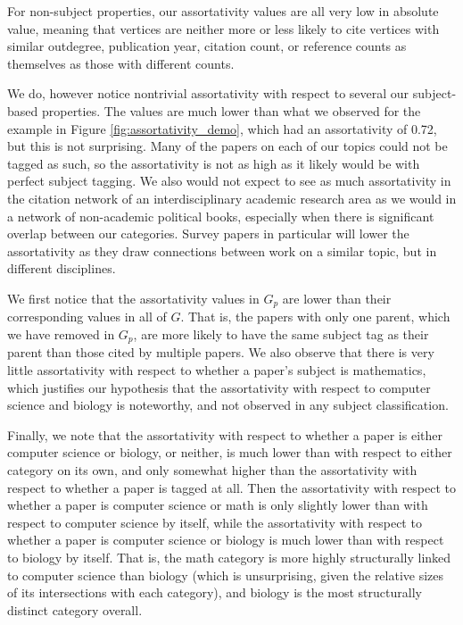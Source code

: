 \documentclass[12pt]{thesis}
\theoremstyle{plain}
\theoremstyle{definition}
\theoremstyle{remark}
\begin{document}
For non-subject properties, our assortativity values are all very low in absolute value, meaning that vertices are neither more or less likely to cite vertices with similar outdegree, publication year, citation count, or reference counts as themselves as those with different counts.

We do, however notice nontrivial assortativity with respect to several our subject-based properties. The values are much lower than what we observed for the example in Figure \ref{fig:assortativity_demo}, which had an assortativity of 0.72, but this is not surprising. Many of the papers on each of our topics could not be tagged as such, so the assortativity is not as high as it likely would be with perfect subject tagging. We also would not expect to see as much assortativity in the citation network of an interdisciplinary academic research area as we would in a network of non-academic political books, especially when there is significant overlap between our categories. Survey papers in particular will lower the assortativity as they draw connections between work on a similar topic, but in different disciplines.

We first notice that the assortativity values in $G_p$ are lower than their corresponding values in all of $G$. That is, the papers with only one parent, which we have removed in $G_p$, are more likely to have the same subject tag as their parent than those cited by multiple papers. We also observe that there is very little assortativity with respect to whether a paper's subject is mathematics, which justifies our hypothesis that the assortativity with respect to computer science and biology is noteworthy, and not observed in any subject classification.

Finally, we note that the assortativity with respect to whether a paper is either computer science or biology, or neither, is much lower than with respect to either category on its own, and only somewhat higher than the assortativity with respect to whether a paper is tagged at all. Then the assortativity with respect to whether a paper is computer science or math is only slightly lower than with respect to computer science by itself, while the assortativity with respect to whether a paper is computer science or biology is much lower than with respect to biology by itself. That is, the math category is more highly structurally linked to computer science than biology (which is unsurprising, given the relative sizes of its intersections with each category), and biology is the most structurally distinct category overall. 
\end{document}
